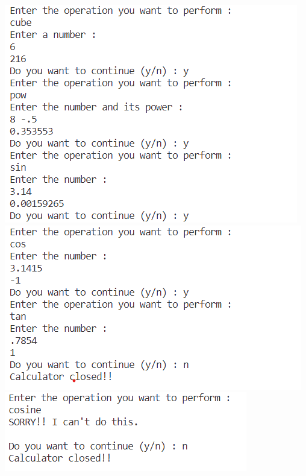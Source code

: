 \documentclass{article}
\begin{document}
\includegraphics[scale=0.70]{cpp_out_04}\\
\includegraphics[scale=0.70]{cpp_out_05}\\
\includegraphics[scale=0.70]{cpp_out_06}\\
\end{document}
